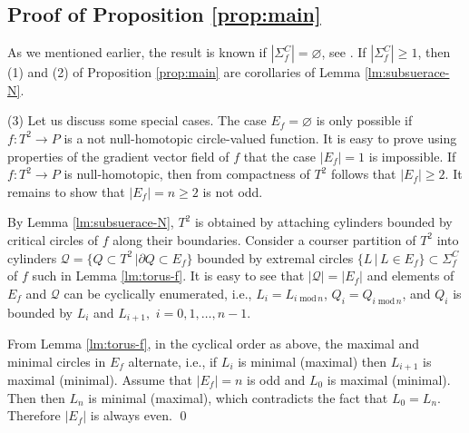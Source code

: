\documentclass[10pt,reqno]{amsart}
\newcommand{\Crit}{\Sigma_f}
\newcommand{\CritC}{\Crit^C}
\begin{document}
\subsection{Proof of Proposition \ref{prop:main}}
As we mentioned earlier, the result is known if $|\CritC| = \varnothing$, see \cite[Remark 2.5.2.]{Maksymenko:TopAppl:2018}.
 If $|\CritC|\geq 1$, then 
 (1) and (2) of Proposition \ref{prop:main} are corollaries of Lemma \ref{lm:subsuerace-N}. 
 
 
 

(3)  Let us discuss some special cases. The case  $E_f = \varnothing$ is only possible if $f:T^2\to P$ is a not null-homotopic circle-valued function. It is easy to prove using properties of the gradient vector field of $f$ that the case $|E_f| = 1$ is impossible.
If $f:T^2\to P$ is null-homotopic, then from compactness of $T^2$ follows that $|E_f|\geq 2$.
It remains to show that $|E_f|= n \geq 2$ is not odd.

By Lemma \ref{lm:subsuerace-N}, $T^2$ is obtained by attaching cylinders bounded by critical circles of $f$ along their boundaries. 
Consider a courser partition of $T^2$ into cylinders $\mathcal{Q} = \{Q\subset T^2\,| \partial Q\subset E_f\}$ bounded by extremal circles $\{L\,|\, L\in E_f\}\subset \CritC$ of $f$ such in Lemma \ref{lm:torus-f}.  It is easy to see that $|\mathcal{Q}| = |E_f|$ and elements of $E_f $ and $\mathcal{Q}$ can be cyclically enumerated, i.e., $L_i = L_{i\;\mathrm{mod}\,n}$,
$Q_i = {Q}_{i\;\mathrm{mod}\,n}$, and $Q_i$ is bounded by $L_i$ and $L_{i+1},$ $i = 0,1,\ldots,n-1$.



From Lemma \ref{lm:torus-f}, in the cyclical order as above, the maximal and minimal circles in $E_f$ alternate, i.e., if $L_i$ is minimal (maximal) then $L_{i+1}$ is maximal (minimal). Assume that $|E_f| = n$ is odd and $L_0$ is maximal (minimal). Then then $L_n$ is minimal (maximal), which contradicts the fact that $L_0 = L_n$. Therefore $|E_f|$ is always even. 
\qed

%
%
\end{document}
